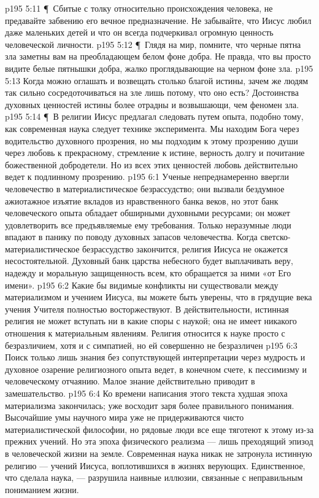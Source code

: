 \vs p195 5:11 \P\ Сбитые с толку относительно происхождения человека, не предавайте забвению его вечное предназначение. Не забывайте, что Иисус любил даже маленьких детей и что он всегда подчеркивал огромную ценность человеческой личности.
\vs p195 5:12 \P\ Глядя на мир, помните, что черные пятна зла заметны вам на преобладающем белом фоне добра. Не правда, что вы просто видите белые пятнышки добра, жалко проглядывающие на черном фоне зла.
\vs p195 5:13 Когда можно оглашать и возвещать столько благой истины, зачем же людям так сильно сосредоточиваться на зле лишь потому, что оно есть? Достоинства духовных ценностей истины более отрадны и возвышающи, чем феномен зла.
\vs p195 5:14 \P\ В религии Иисус предлагал следовать путем опыта, подобно тому, как современная наука следует технике эксперимента. Мы находим Бога через водительство духовного прозрения, но мы подходим к этому прозрению души через любовь к прекрасному, стремление к истине, верность долгу и почитание божественной добродетели. Но из всех этих ценностей любовь действительно ведет к подлинному прозрению.
\vs p195 6:1 Ученые непреднамеренно ввергли человечество в материалистическое безрассудство; они вызвали бездумное ажиотажное изъятие вкладов из нравственного банка веков, но этот банк человеческого опыта обладает обширными духовными ресурсами; он может удовлетворить все предъявляемые ему требования. Только неразумные люди впадают в панику по поводу духовных запасов человечества. Когда светско\hyp{}материалистическое безрассудство закончится, религия Иисуса не окажется несостоятельной. Духовный банк царства небесного будет выплачивать веру, надежду и моральную защищенность всем, кто обращается за ними «от Его имени».
\vs p195 6:2 Какие бы видимые конфликты ни существовали между материализмом и учением Иисуса, вы можете быть уверены, что в грядущие века учения Учителя полностью восторжествуют. В действительности, истинная религия не может вступать ни в какие споры с наукой; она не имеет никакого отношения к материальным явлениям. Религия относится к науке просто с безразличием, хотя и с симпатией, но ей совершенно не безразличен 
\vs p195 6:3 Поиск только лишь знания без сопутствующей интерпретации через мудрость и духовное озарение религиозного опыта ведет, в конечном счете, к пессимизму и человеческому отчаянию. Малое знание действительно приводит в замешательство.
\vs p195 6:4 Ко времени написания этого текста худшая эпоха материализма закончилась; уже восходит заря более правильного понимания. Высочайшие умы научного мира уже не придерживаются чисто материалистической философии, но рядовые люди все еще тяготеют к этому из\hyp{}за прежних учений. Но эта эпоха физического реализма --- лишь преходящий эпизод в человеческой жизни на земле. Современная наука никак не затронула истинную религию --- учений Иисуса, воплотившихся в жизнях верующих. Единственное, что сделала наука, --- разрушила наивные иллюзии, связанные с неправильным пониманием жизни.
